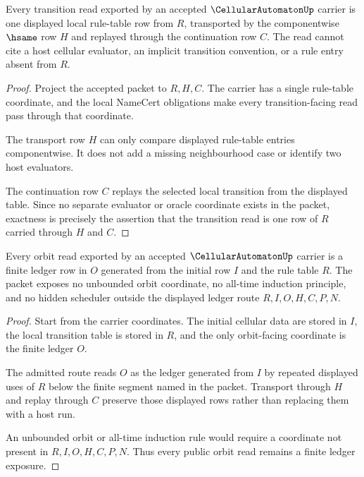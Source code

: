 \begin{theorem}
\label{thm:cellular-automaton-rule-table-exactness}
Every transition read exported by an accepted $\CellularAutomatonUp$ carrier is one displayed local rule-table row from $R$, transported by the componentwise $\hsame$ row $H$ and replayed through the continuation row $C$. The read cannot cite a host cellular evaluator, an implicit transition convention, or a rule entry absent from $R$.
\end{theorem}
\begin{proof}
Project the accepted packet to $R,H,C$. The carrier has a single rule-table coordinate, and the local NameCert obligations make every transition-facing read pass through that coordinate.

The transport row $H$ can only compare displayed rule-table entries componentwise. It does not add a missing neighbourhood case or identify two host evaluators.

The continuation row $C$ replays the selected local transition from the displayed table. Since no separate evaluator or oracle coordinate exists in the packet, exactness is precisely the assertion that the transition read is one row of $R$ carried through $H$ and $C$.
\end{proof}

\begin{theorem}
\label{thm:cellular-automaton-finite-orbit-exposure}
Every orbit read exported by an accepted $\CellularAutomatonUp$ carrier is a finite ledger row in $O$ generated from the initial row $I$ and the rule table $R$. The packet exposes no unbounded orbit coordinate, no all-time induction principle, and no hidden scheduler outside the displayed ledger route $R,I,O,H,C,P,N$.
\end{theorem}
\begin{proof}
Start from the carrier coordinates. The initial cellular data are stored in $I$, the local transition table is stored in $R$, and the only orbit-facing coordinate is the finite ledger $O$.

The admitted route reads $O$ as the ledger generated from $I$ by repeated displayed uses of $R$ below the finite segment named in the packet. Transport through $H$ and replay through $C$ preserve those displayed rows rather than replacing them with a host run.

An unbounded orbit or all-time induction rule would require a coordinate not present in $R,I,O,H,C,P,N$. Thus every public orbit read remains a finite ledger exposure.
\end{proof}

